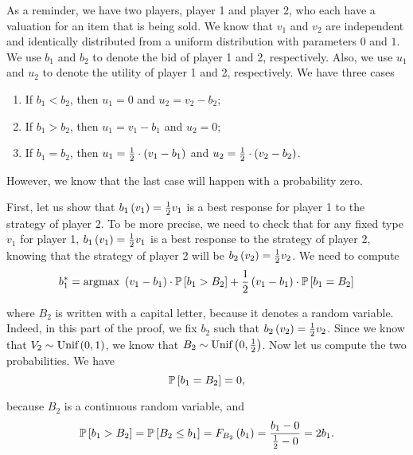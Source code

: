 As a reminder, we have two players, player 1 and player 2, who each have a valuation for an item that is being sold. We know that $v_1$ and $v_2$ are independent and identically distributed from a uniform distribution with parameters $0$ and $1$. We use $b_1$ and $b_2$ to denote the bid of player 1 and 2, respectively. Also, we use $u_1$ and $u_2$ to denote the utility of player 1 and 2, respectively. We have three cases
\begin{enumerate}
    \item If $b_1 < b_2$, then $u_1 = 0$ and $u_2 = v_2 - b_2$;
    \item If $b_1 > b_2$, then $u_1 = v_1 - b_1$ and $u_2 = 0$;
    \item If $b_1 = b_2$, then $u_1 = \frac{1}{2} \cdot \parent{v_1 - b_1}$ and $u_2 = \frac{1}{2} \cdot \parent{v_2 - b_2}$.
\end{enumerate}

However, we know that the last case will happen with a probability zero.

\vspace{5mm}


First, let us show that $b_1 \parent{v_1} = \frac{1}{2} v_1$ is a best response for player 1 to the strategy of player 2. To be more precise, we need to check that for any fixed type $v_1$ for player 1, $b_1 \parent{v_1} = \frac{1}{2} v_1$ is a best response to the strategy of player 2, knowing that the strategy of player 2 will be $b_2 \parent{v_2} = \frac{1}{2} v_2$.
We need to compute
\begin{equation*}
    b_1^{*}
    = \text{argmax} \
    \parent{v_1 - b_1} \cdot \mathbb{P} \squared{b_1 > B_2}
    + \dfrac{1}{2} \parent{v_1 - b_1} \cdot \mathbb{P} \squared{b_1 = B_2}
\end{equation*}

where $B_2$ is written with a capital letter, because it denotes a random variable. Indeed, in this part of the proof, we fix $b_2$ such that $b_2 \parent{v_2} = \frac{1}{2} v_2$. Since we know that $V_2 \sim \text{Unif} \parent{0, 1}$, we know that $B_2 \sim \text{Unif} \parent{0, \frac{1}{2}}$. Now let us compute the two probabilities. We have
\begin{equation*}
    \mathbb{P} \squared{b_1 = B_2}
    = 0,
\end{equation*}

because $B_2$ is a continuous random variable, and
\begin{equation*}
    \mathbb{P} \squared{b_1 > B_2}
    = \mathbb{P} \squared{B_2 \leq b_1}
    = F_{B_2} \parent{b_1}
    = \dfrac{b_1 - 0}{\frac{1}{2} - 0}
    = 2 b_1.
\end{equation*}


